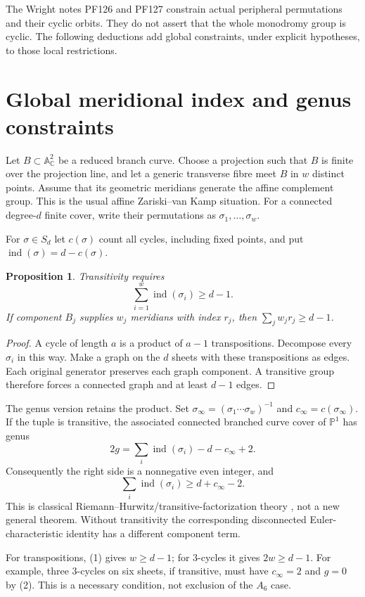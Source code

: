 \documentclass[11pt]{article}
\newtheorem{proposition}{Proposition}
\newcommand{\C}{\mathbb C}
\newcommand{\A}{\mathbb A}
\newcommand{\ind}{\operatorname{ind}}
\begin{document}
The Wright notes PF126 and PF127 constrain actual peripheral permutations
and their cyclic orbits. They do not assert that the whole monodromy group
is cyclic. The following deductions add global constraints, under explicit
hypotheses, to those local restrictions.

\section{Global meridional index and genus constraints}

Let $B\subset\A^2_\C$ be a reduced branch curve. Choose a projection such
that $B$ is finite over the projection line, and let a generic transverse
fibre meet $B$ in $w$ distinct points. Assume that its geometric meridians
generate the affine complement group. This is the usual affine
Zariski--van Kamp situation. For a connected degree-$d$ finite cover,
write their permutations as $\sigma_1,\ldots,\sigma_w$.

For $\sigma\in S_d$ let $c(\sigma)$ count all cycles, including fixed points,
and put $\ind(\sigma)=d-c(\sigma)$.
\begin{proposition}
Transitivity requires
\[
             \sum_{i=1}^w\ind(\sigma_i)\ge d-1.                 \tag{1}
\]
If component $B_j$ supplies $w_j$ meridians with index $r_j$, then
$\sum_j w_jr_j\ge d-1$.
\end{proposition}
\begin{proof}
A cycle of length $a$ is a product of $a-1$ transpositions. Decompose every
$\sigma_i$ in this way. Make a graph on the $d$ sheets with these
transpositions as edges. Each original generator preserves each graph
component. A transitive group therefore forces a connected graph and at
least $d-1$ edges.
\end{proof}

The genus version retains the product. Set
$\sigma_\infty=(\sigma_1\cdots\sigma_w)^{-1}$ and
$c_\infty=c(\sigma_\infty)$. If the tuple is transitive, the associated
connected branched curve cover of $\mathbb P^1$ has genus
\[
 2g=\sum_i\ind(\sigma_i)-d-c_\infty+2.                         \tag{2}
\]
Consequently the right side is a nonnegative even integer, and
\[
       \sum_i\ind(\sigma_i)\ge d+c_\infty-2.                 \tag{3}
\]
This is classical Riemann--Hurwitz/transitive-factorization theory
\cite{gouldenjackson}, not a new general theorem. Without transitivity the
corresponding disconnected Euler-characteristic identity has a different
component term.

For transpositions, (1) gives $w\ge d-1$; for $3$-cycles it gives
$2w\ge d-1$. For example, three $3$-cycles on six sheets, if transitive,
must have $c_\infty=2$ and $g=0$ by (2). This is a necessary condition,
not exclusion of the $A_6$ case.
\end{document}
